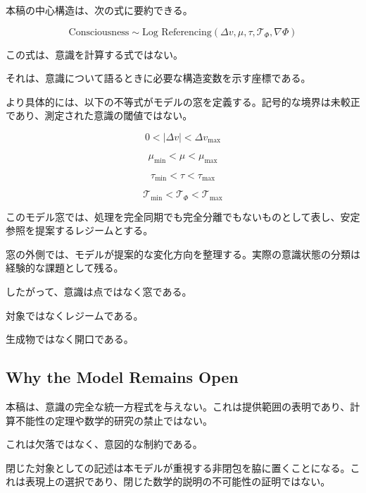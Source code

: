 本稿の中心構造は、次の式に要約できる。

\begin{equation}
\text{Consciousness}
\sim
\text{Log Referencing}
\left(
\Delta v,
\mu,
\tau,
\mathcal{T}_{\Phi},
\nabla \Phi
\right)
\end{equation}

この式は、意識を計算する式ではない。

それは、意識について語るときに必要な構造変数を示す座標である。

より具体的には、以下の不等式がモデルの窓を定義する。記号的な境界は未較正であり、測定された意識の閾値ではない。

\begin{equation}
0 < |\Delta v| < \Delta v_{\max}
\end{equation}

\begin{equation}
\mu_{\min} < \mu < \mu_{\max}
\end{equation}

\begin{equation}
\tau_{\min} < \tau < \tau_{\max}
\end{equation}

\begin{equation}
\mathcal{T}_{\min}
<
\mathcal{T}_{\Phi}
<
\mathcal{T}_{\max}
\end{equation}

このモデル窓では、処理を完全同期でも完全分離でもないものとして表し、安定参照を提案するレジームとする。

窓の外側では、モデルが提案的な変化方向を整理する。実際の意識状態の分類は経験的な課題として残る。

したがって、意識は点ではなく窓である。

対象ではなくレジームである。

生成物ではなく開口である。

\subsection{Why the Model Remains Open}

本稿は、意識の完全な統一方程式を与えない。これは提供範囲の表明であり、計算不能性の定理や数学的研究の禁止ではない。

これは欠落ではなく、意図的な制約である。

閉じた対象としての記述は本モデルが重視する非閉包を脇に置くことになる。これは表現上の選択であり、閉じた数学的説明の不可能性の証明ではない。

